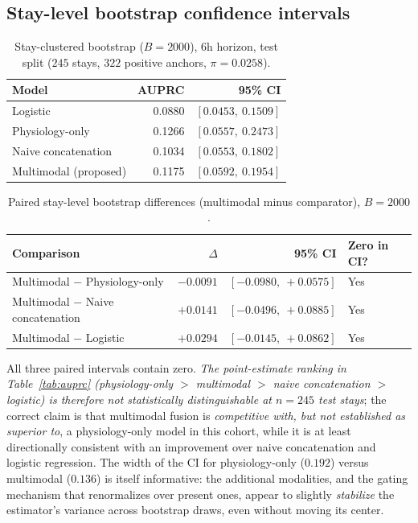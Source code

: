 \documentclass[11pt]{article}
\newcommand{\1}[1]{\mathbf{1}\!\left[#1\right]}
\begin{document}
\subsection{Stay-level bootstrap confidence intervals}

\begin{table}[h]
\centering
\caption{Stay-clustered bootstrap ($B=2000$), 6h horizon, test split ($245$ stays, $322$ positive anchors, $\pi=0.0258$).}
\label{tab:bootstrap}
\begin{tabular}{lrr}
\toprule
Model & AUPRC & 95\% CI \\
\midrule
Logistic & 0.0880 & $[0.0453,\ 0.1509]$ \\
Physiology-only & 0.1266 & $[0.0557,\ 0.2473]$ \\
Naive concatenation & 0.1034 & $[0.0553,\ 0.1802]$ \\
Multimodal (proposed) & 0.1175 & $[0.0592,\ 0.1954]$ \\
\bottomrule
\end{tabular}
\end{table}

\begin{table}[h]
\centering
\caption{Paired stay-level bootstrap differences (multimodal minus comparator), $B=2000$.}
\begin{tabular}{lrrl}
\toprule
Comparison & $\Delta$ & 95\% CI & Zero in CI? \\
\midrule
Multimodal $-$ Physiology-only & $-0.0091$ & $[-0.0980,\ +0.0575]$ & Yes \\
Multimodal $-$ Naive concatenation & $+0.0141$ & $[-0.0496,\ +0.0885]$ & Yes \\
Multimodal $-$ Logistic & $+0.0294$ & $[-0.0145,\ +0.0862]$ & Yes \\
\bottomrule
\end{tabular}
\end{table}
All three paired intervals contain zero. \emph{The point-estimate ranking in Table~\ref{tab:auprc} (physiology-only $>$ multimodal $>$ naive concatenation $>$ logistic) is therefore not statistically distinguishable at $n=245$ test stays}; the correct claim is that multimodal fusion is \emph{competitive with, but not established as superior to}, a physiology-only model in this cohort, while it is at least directionally consistent with an improvement over naive concatenation and logistic regression. The width of the CI for physiology-only ($0.192$) versus multimodal ($0.136$) is itself informative: the additional modalities, and the gating mechanism that renormalizes over present ones, appear to slightly \emph{stabilize} the estimator's variance across bootstrap draws, even without moving its center.
\end{document}
